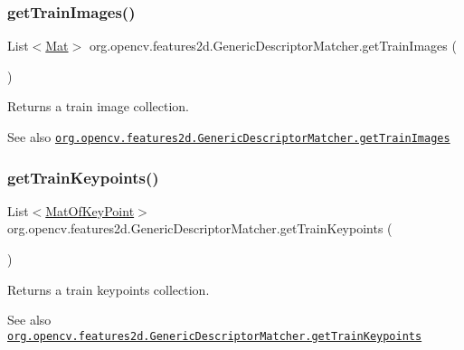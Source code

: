 \subsubsection{\texorpdfstring{get\+Train\+Images()}{getTrainImages()}}
{\footnotesize\ttfamily List$<$\mbox{\hyperlink{classorg_1_1opencv_1_1core_1_1_mat}{Mat}}$>$ org.\+opencv.\+features2d.\+Generic\+Descriptor\+Matcher.\+get\+Train\+Images (\begin{DoxyParamCaption}{ }\end{DoxyParamCaption})}

Returns a train image collection.

\begin{DoxySeeAlso}{See also}
\href{http://docs.opencv.org/modules/features2d/doc/common_interfaces_of_generic_descriptor_matchers.html#genericdescriptormatcher-gettrainimages}{\tt org.\+opencv.\+features2d.\+Generic\+Descriptor\+Matcher.\+get\+Train\+Images} 
\end{DoxySeeAlso}
\mbox{\label{classorg_1_1opencv_1_1features2d_1_1_generic_descriptor_matcher_a334b393c4b8d79b117797ddc5dfcd940}} 
\subsubsection{\texorpdfstring{get\+Train\+Keypoints()}{getTrainKeypoints()}}
{\footnotesize\ttfamily List$<$\mbox{\hyperlink{classorg_1_1opencv_1_1core_1_1_mat_of_key_point}{Mat\+Of\+Key\+Point}}$>$ org.\+opencv.\+features2d.\+Generic\+Descriptor\+Matcher.\+get\+Train\+Keypoints (\begin{DoxyParamCaption}{ }\end{DoxyParamCaption})}

Returns a train keypoints collection.

\begin{DoxySeeAlso}{See also}
\href{http://docs.opencv.org/modules/features2d/doc/common_interfaces_of_generic_descriptor_matchers.html#genericdescriptormatcher-gettrainkeypoints}{\tt org.\+opencv.\+features2d.\+Generic\+Descriptor\+Matcher.\+get\+Train\+Keypoints} 
\end{DoxySeeAlso}
\mbox{\label{classorg_1_1opencv_1_1features2d_1_1_generic_descriptor_matcher_aaeb65b1ba87c1babb2d37fa7f2f4fa71}} 
